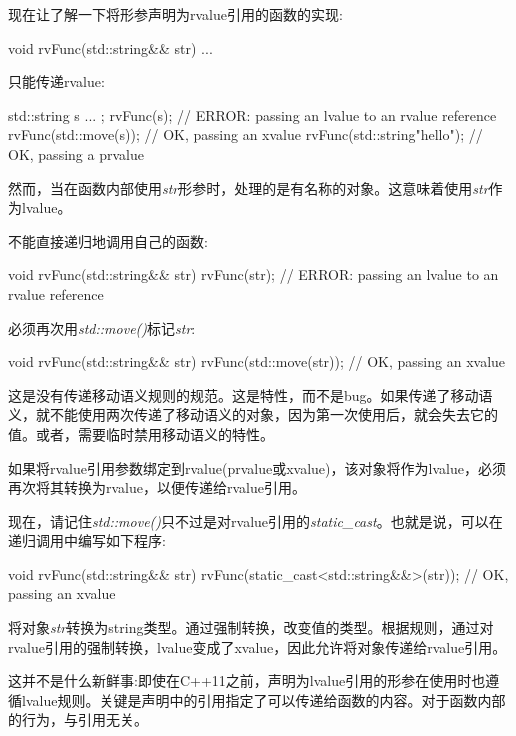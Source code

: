 现在让了解一下将形参声明为rvalue引用的函数的实现:

\begin{cppcode}
void rvFunc(std::string&& str) {
	...
}
\end{cppcode}

只能传递rvalue:

\begin{cppcode}
std::string s{ ... };
rvFunc(s); // ERROR: passing an lvalue to an rvalue reference
rvFunc(std::move(s)); // OK, passing an xvalue
rvFunc(std::string{"hello"}); // OK, passing a prvalue
\end{cppcode}

然而，当在函数内部使用\textit{str}形参时，处理的是有名称的对象。这意味着使用\textit{str}作为lvalue。

不能直接递归地调用自己的函数:

\begin{cppcode}
void rvFunc(std::string&& str) {
	rvFunc(str); // ERROR: passing an lvalue to an rvalue reference
}
\end{cppcode}

必须再次用\textit{std::move()}标记\textit{str}:

\begin{cppcode}
void rvFunc(std::string&& str) {
	rvFunc(std::move(str)); // OK, passing an xvalue
}
\end{cppcode}

这是没有传递移动语义规则的规范。这是特性，而不是bug。如果传递了移动语义，就不能使用两次传递了移动语义的对象，因为第一次使用后，就会失去它的值。或者，需要临时禁用移动语义的特性。

如果将rvalue引用参数绑定到rvalue(prvalue或xvalue)，该对象将作为lvalue，必须再次将其转换为rvalue，以便传递给rvalue引用。

现在，请记住\textit{std::move()}只不过是对rvalue引用的\textit{static_cast}。也就是说，可以在递归调用中编写如下程序:

\begin{cppcode}
void rvFunc(std::string&& str) {
	rvFunc(static_cast<std::string&&>(str)); // OK, passing an xvalue
}
\end{cppcode}

将对象\textit{str}转换为string类型。通过强制转换，改变值的类型。根据规则，通过对rvalue引用的强制转换，lvalue变成了xvalue，因此允许将对象传递给rvalue引用。

这并不是什么新鲜事:即使在C++11之前，声明为lvalue引用的形参在使用时也遵循lvalue规则。关键是声明中的引用指定了可以传递给函数的内容。对于函数内部的行为，与引用无关。

